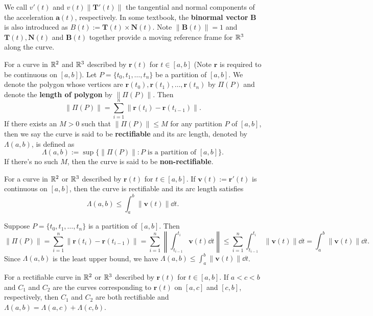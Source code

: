     \begin{remarkenv}
        We call $v'(t)$ and $v(t) \| \bm T'(t)\|$ the tangential and normal components of the acceleration $\bm a(t)$, respectively. In some textbook, the \textbf{binormal vector} $\bm B$ is also introduced as $B(t) := \bm T(t) \times \bm N(t)$. Note $\left\| \bm B(t) \right\|=1$ and $\bm T(t), \bm N(t)$ and $\bm B(t)$ together provide a moving reference frame for $\mathbb{R}^3$ along the curve.
    \end{remarkenv}
    \begin{definitionenv}
        For a curve in $\mathbb{R}^2$ and $\mathbb{R}^3$ described by $\bm r(t)$ for $t\in [a,b]$ (Note $\bm r$ is required to be continuous on $[a,b]$). Let $P=\{t_0, t_1, \ldots, t_n\}$ be a partition of $[a,b]$. We denote the polygon whose vertices are $\bm r(t_0), \bm r(t_1), \ldots, \bm r(t_n)$ by $\Pi (P)$ and denote the \textbf{length of polygon} by $\| \Pi (P)\|$. Then
        $$ \| \Pi (P)\| = \sum_{i=1}^n \| \bm r(t_i) - \bm r(t_{i-1})\|. $$
        If there exists an $M>0$ such that $\| \Pi (P)\| \le M$ for any partition $P$ of $[a,b]$, then we say the curve is said to be \textbf{rectifiable} and its arc length, denoted by $\Lambda(a,b)$, is defined as
        $$ \Lambda(a,b) := \sup \{ \| \Pi (P)\| : P \text{ is a partition of } [a,b]\}. $$
        If there's no such $M$, then the curve is said to be \textbf{non-rectifiable}.
    \end{definitionenv}
    \begin{theoremenv}
        For a curve in $\mathbb{R}^2$ or $\mathbb{R}^3$ described by $\bm r(t)$ for $t\in [a,b]$. If $\bm v(t) := \bm r'(t)$ is continuous on $[a,b]$, then the curve is rectifiable and its arc length satisfies
        $$ \Lambda(a,b) \le \int_a^b \| \bm v(t)\| \dd t. $$

    \end{theoremenv}
    \begin{proofenv}
        Suppose $P = \{t_0, t_1, \ldots, t_n\}$ is a partition of $[a,b]$. Then
        $$ \| \Pi (P)\| = \sum_{i=1}^n \| \bm r(t_i) - \bm r(t_{i-1})\| = \sum_{i=1}^n \left\| \int_{t_{i-1}}^{t_i} \bm v(t) \dd t \right\| \le \sum_{i=1}^n \int_{t_{i-1}}^{t_i} \| \bm v(t)\| \dd t = \int_a^b \| \bm v(t)\| \dd t. $$
        Since $\Lambda (a,b) $ is the least upper bound, we have $\Lambda(a,b)\displaystyle \le \int_a^b \| \bm v(t)\| \dd t$.
    \end{proofenv}
    \begin{theoremenv}
        For a rectifiable curve in $\mathbb{R}^2$ or $\mathbb{R}^3$ described by $\bm r(t)$ for $t\in [a,b]$. If $a<c<b$ and $C_1$ and $C_2$ are the curves corresponding to $\bm r(t)$ on $[a,c]$ and $[c,b]$, respectively, then $C_1$ and $C_2$ are both rectifiable and $\Lambda(a,b) = \Lambda(a,c) + \Lambda(c,b)$.
    \end{theoremenv}
